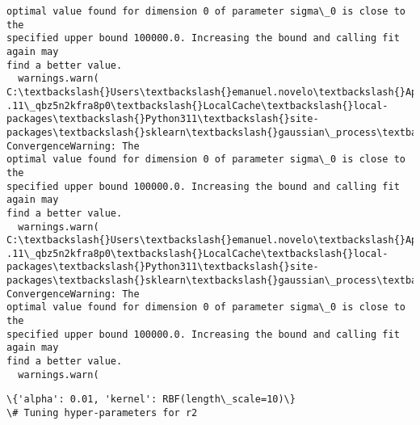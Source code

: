 \documentclass[11pt]{article}
\begin{document}
\begin{Verbatim}[commandchars=\\\{\}]
optimal value found for dimension 0 of parameter sigma\_0 is close to the
specified upper bound 100000.0. Increasing the bound and calling fit again may
find a better value.
  warnings.warn(
C:\textbackslash{}Users\textbackslash{}emanuel.novelo\textbackslash{}AppData\textbackslash{}Local\textbackslash{}Packages\textbackslash{}PythonSoftwareFoundation.Python.3
.11\_qbz5n2kfra8p0\textbackslash{}LocalCache\textbackslash{}local-packages\textbackslash{}Python311\textbackslash{}site-
packages\textbackslash{}sklearn\textbackslash{}gaussian\_process\textbackslash{}kernels.py:429: ConvergenceWarning: The
optimal value found for dimension 0 of parameter sigma\_0 is close to the
specified upper bound 100000.0. Increasing the bound and calling fit again may
find a better value.
  warnings.warn(
C:\textbackslash{}Users\textbackslash{}emanuel.novelo\textbackslash{}AppData\textbackslash{}Local\textbackslash{}Packages\textbackslash{}PythonSoftwareFoundation.Python.3
.11\_qbz5n2kfra8p0\textbackslash{}LocalCache\textbackslash{}local-packages\textbackslash{}Python311\textbackslash{}site-
packages\textbackslash{}sklearn\textbackslash{}gaussian\_process\textbackslash{}kernels.py:429: ConvergenceWarning: The
optimal value found for dimension 0 of parameter sigma\_0 is close to the
specified upper bound 100000.0. Increasing the bound and calling fit again may
find a better value.
  warnings.warn(
    \end{Verbatim}

    \begin{Verbatim}[commandchars=\\\{\}]
\{'alpha': 0.01, 'kernel': RBF(length\_scale=10)\}
\# Tuning hyper-parameters for r2

    \end{Verbatim}
\end{document}
